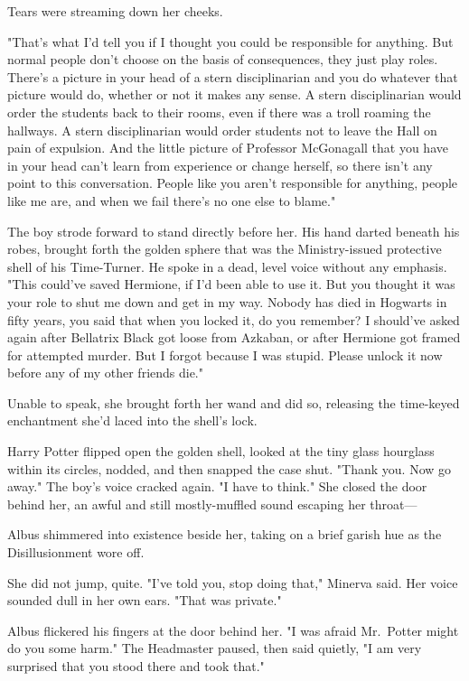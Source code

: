 Tears were streaming down her cheeks.

"That's what I'd tell you if I thought you could be responsible for anything.
But normal people don't choose on the basis of consequences, they just play
roles. There's a picture in your head of a stern disciplinarian and you do
whatever that picture would do, whether or not it makes any sense. A stern
disciplinarian would order the students back to their rooms, even if there was
a troll roaming the hallways. A stern disciplinarian would order students not
to leave the Hall on pain of expulsion. And the little picture of Professor
McGonagall that you have in your head can't learn from experience or change
herself, so there isn't any point to this conversation. People like you aren't
responsible for anything, people like me are, and when we fail there's no one
else to blame."

The boy strode forward to stand directly before her. His hand darted beneath
his robes, brought forth the golden sphere that was the Ministry-issued
protective shell of his Time-Turner. He spoke in a dead, level voice without
any emphasis. "This could've saved Hermione, if I'd been able to use it. But
you thought it was your role to shut me down and get in my way. Nobody has died
in Hogwarts in fifty years, you said that when you locked it, do you remember?
I should've asked again after Bellatrix Black got loose from Azkaban, or after
Hermione got framed for attempted murder. But I forgot because I was stupid.
Please unlock it now before any of my other friends die."

Unable to speak, she brought forth her wand and did so, releasing the
time-keyed enchantment she'd laced into the shell's lock.

Harry Potter flipped open the golden shell, looked at the tiny glass hourglass
within its circles, nodded, and then snapped the case shut. "Thank you. Now go
away." The boy's voice cracked again. "I have to think."
\sbreak
She closed the door behind her, an awful and still mostly-muffled sound
escaping her throat\mbox{---}

Albus shimmered into existence beside her, taking on a brief garish hue as the
Disillusionment wore off.

She did not jump, quite. "I've told you, stop doing that," Minerva said. Her
voice sounded dull in her own ears. "That was private."

Albus flickered his fingers at the door behind her. "I was afraid Mr.~Potter
might do you some harm." The Headmaster paused, then said quietly, "I am very
surprised that you stood there and took that."

